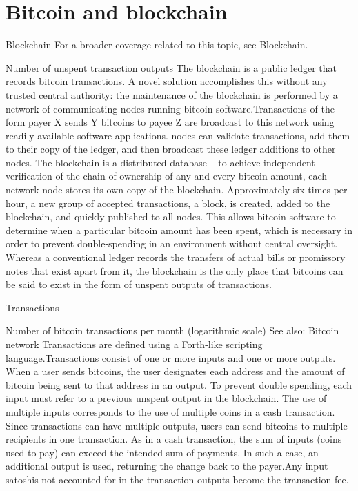\documentclass[
  digital, %
  table,   %
  lof,     %
  lot,     %
  oneside
]{fithesis3}
\begin{document}
\section{Bitcoin and blockchain}
Blockchain
For a broader coverage related to this topic, see Blockchain.

Number of unspent transaction outputs
The blockchain is a public ledger that records bitcoin transactions.
A novel solution accomplishes this without any trusted central authority: the maintenance of the blockchain is performed by a network of communicating nodes
running bitcoin software.Transactions of the form payer X sends Y bitcoins to payee Z are broadcast to this network using readily available software applications.
nodes can validate transactions, add them to their copy of the ledger, and then broadcast these ledger additions to other nodes. The blockchain is a distributed database – to achieve independent verification of the chain of ownership 
of any and every bitcoin amount, each network node stores its own copy of the blockchain. Approximately six times per hour, a new group of accepted transactions, a block, is created, added to the blockchain, and quickly published to all nodes.
This allows bitcoin software to determine when a particular bitcoin amount has been spent, which is necessary in order to prevent double-spending in an environment without central oversight. 
Whereas a conventional ledger records the transfers of actual bills or promissory notes that exist apart from it, the blockchain is the only place that bitcoins can be said to exist in the form of unspent outputs of transactions.

Transactions

Number of bitcoin transactions per month (logarithmic scale)
See also: Bitcoin network
Transactions are defined using a Forth-like scripting language.Transactions consist of one or more inputs and one or more outputs.
When a user sends bitcoins, the user designates each address and the amount of bitcoin being sent to that address in an output. 
To prevent double spending, each input must refer to a previous unspent output in the blockchain. The use of multiple inputs corresponds to the use of multiple coins in a cash transaction.
Since transactions can have multiple outputs, users can send bitcoins to multiple recipients in one transaction. As in a cash transaction, the sum of inputs (coins used to pay) can exceed the intended sum of payments.
In such a case, an additional output is used, returning the change back to the payer.Any input satoshis not accounted for in the transaction outputs become the transaction fee.
\end{document}
